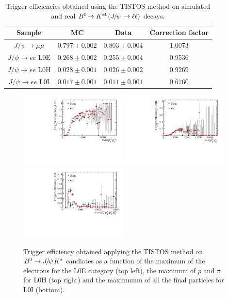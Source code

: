 \begin{table}[hb!]
\begin{center}
 \caption{Trigger efficiencies obtained using the TISTOS method on
 simulated and real $\decay{\Bz}{\Kstarz(\jpsi\to\ell\ell)}$ decays.}
\begin{tabular}{|c|c|c|c|}
\hline
 Sample 							&  MC  			& Data 		& Correction factor		\\ \hline
$ J/\psi \rightarrow \mu\mu$ 		& $ 0.797  \pm  0.002 $ & $ 0.803  \pm  0.004 $  &  1.0073  \\
$J/\psi \rightarrow ee$ L0E 	& $ 0.268  \pm  0.002 $ & $ 0.255  \pm  0.004 $  &  0.9536   \\
$J/\psi \rightarrow ee$ L0H 	& $ 0.028  \pm  0.001 $ & $ 0.026  \pm  0.002 $  &  0.9269   \\
$J/\psi \rightarrow ee$ L0I 	& $ 0.017  \pm  0.001 $ & $ 0.011  \pm  0.001 $  &  0.6760   \\
\hline 
\end{tabular}
\label{tab:tistos}
\end{center}
\end{table}

\begin{figure}[h!]
\centering
\includegraphics[width=0.48\textwidth]{RKst/figs/TisTos_vs_maxPTLL_L0E.pdf}
\includegraphics[width=0.48\textwidth]{RKst/figs/TisTos_vs_maxPTHH_L0H.pdf}
\includegraphics[width=0.48\textwidth]{RKst/figs/TisTos_vs_maxPT_L0I.pdf}
\caption{Trigger efficiency obtained applying the TISTOS method on $\Bz\to\jpsi\Kstar$ candiates
as a function of the maximum \pt of the electrons for the L0E category (top left), the maximum \pt
of $p$ and $\pi$ for L0H (top right) and the maximumm \pt of all the final particles for L0I (bottom).}
\label{fig:tistos_vs_pt}
\end{figure}



